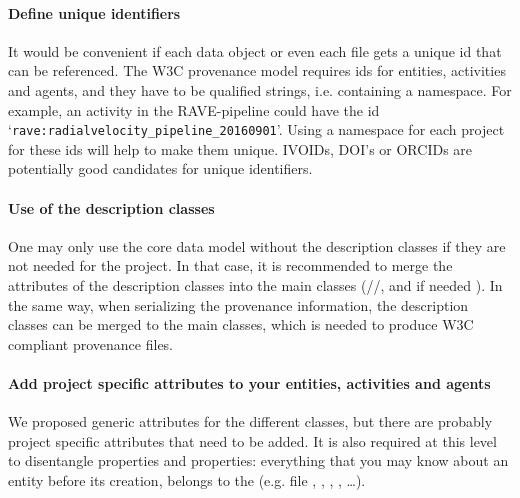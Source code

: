 \paragraph{Define unique identifiers}
It would be convenient if each data object or even each file 
gets a unique id that can be referenced. The W3C provenance model requires ids
for entities, activities and agents, and they have to be qualified strings, 
i.e. containing a namespace. For example, an activity in the RAVE-pipeline could 
have the id `\texttt{rave:radialvelocity\_pipeline\_20160901}'. 
Using a namespace for each 
project for these ids will help to make them unique. 
IVOIDs, DOI's or ORCIDs are potentially good candidates for unique identifiers.

\paragraph{Use of the description classes} 
One may only use the core data model without the description classes if they are not needed for the project. In that case, it is recommended to merge the attributes of the description classes into the main classes (//, and if needed ). In the same way, when serializing the provenance information, the description classes can be merged to the main classes, which is needed to produce W3C compliant provenance files.

\paragraph{Add project specific attributes to your entities, activities and agents}
We proposed generic attributes for the different classes, but there are probably project specific attributes that need to be added. 
It is also required at this level to disentangle  properties and  properties: everything that you may know about an entity before its creation, belongs to the  (e.g. file , , , , \dots).

